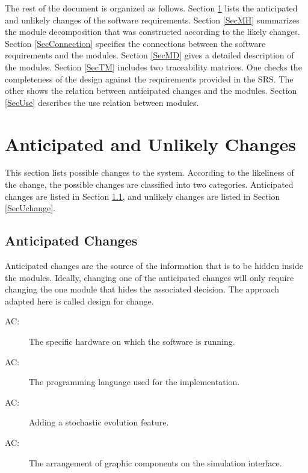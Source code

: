 \documentclass[12pt, titlepage]{article}
\newcounter{acnum}
\newcommand{\actheacnum}{AC\theacnum}
\begin{document}
The rest of the document is organized as follows. Section
\ref{SecChange} lists the anticipated and unlikely changes of the software
requirements. Section \ref{SecMH} summarizes the module decomposition that
was constructed according to the likely changes. Section \ref{SecConnection}
specifies the connections between the software requirements and the
modules. Section \ref{SecMD} gives a detailed description of the
modules. Section \ref{SecTM} includes two traceability matrices. One checks
the completeness of the design against the requirements provided in the SRS. The
other shows the relation between anticipated changes and the modules. Section
\ref{SecUse} describes the use relation between modules.

\section{Anticipated and Unlikely Changes} \label{SecChange}

This section lists possible changes to the system. According to the likeliness
of the change, the possible changes are classified into two
categories. Anticipated changes are listed in Section \ref{SecAchange}, and
unlikely changes are listed in Section \ref{SecUchange}.

\subsection{Anticipated Changes} \label{SecAchange}

Anticipated changes are the source of the information that is to be hidden
inside the modules. Ideally, changing one of the anticipated changes will only
require changing the one module that hides the associated decision. The approach
adapted here is called design for
change.

\begin{description}
\item[ \actheacnum \label{acHardware}:] The specific
  hardware on which the software is running.
\item[ \actheacnum \label{acLangage}:] The programming language used for the implementation.

\item[ \actheacnum \label{acStochastic}:] Adding a stochastic evolution feature.

\item[ \actheacnum \label{acInterface}:] The arrangement of graphic components on the simulation interface.

\end{description}
\end{document}
